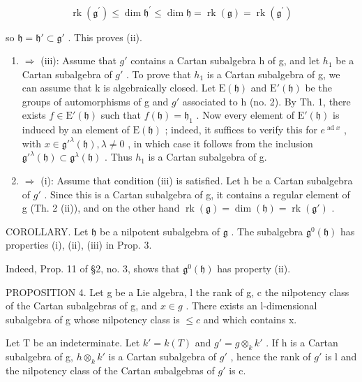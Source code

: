 \[
\operatorname{rk} \left(\mathfrak {g} ^ {\prime}\right) \leq \dim \mathfrak {h} ^ {\prime} \leq \dim \mathfrak {h} = \operatorname{rk} (\mathfrak {g}) = \operatorname{rk} \left(\mathfrak {g} ^ {\prime}\right)
\]

so \(\mathfrak{h} = \mathfrak{h}'\subset \mathfrak{g}'\) . This proves (ii).

\begin{enumerate}
\def\labelenumi{(\roman{enumi})}
\setcounter{enumi}{1}
\item
  \(\Longrightarrow\) (iii): Assume that \(g'\) contains a Cartan subalgebra h of g, and let \(h_{1}\) be a Cartan subalgebra of \(g'\) . To prove that \(h_{1}\) is a Cartan subalgebra of g, we can assume that k is algebraically closed. Let \(\mathrm{E}(\mathfrak{h})\) and \(\mathrm{E}'(\mathfrak{h})\) be the groups of automorphisms of g and \(g'\) associated to h (no. 2). By Th. 1, there exists \(f \in \mathrm{E}'(\mathfrak{h})\) such that \(f(\mathfrak{h}) = \mathfrak{h}_{1}\) . Now every element of \(\mathrm{E}'(\mathfrak{h})\) is induced by an element of \(\mathrm{E}(\mathfrak{h})\) ; indeed, it suffices to verify this for \(e^{\operatorname{ad} x}\) , with \(x \in \mathfrak{g}'^{\lambda}(\mathfrak{h}), \lambda \neq 0\) , in which case it follows from the inclusion \(\mathfrak{g}'^{\lambda}(\mathfrak{h}) \subset \mathfrak{g}^{\lambda}(\mathfrak{h})\) . Thus \(h_{1}\) is a Cartan subalgebra of g.
\item
  \(\Longrightarrow\) (i): Assume that condition (iii) is satisfied. Let h be a Cartan subalgebra of \(g'\) . Since this is a Cartan subalgebra of g, it contains a regular element of g (Th. 2 (ii)), and on the other hand \(\operatorname{rk}(\mathfrak{g}) = \dim(\mathfrak{h}) = \operatorname{rk}(\mathfrak{g}')\) .
\end{enumerate}

COROLLARY. Let \(\mathfrak{h}\) be a nilpotent subalgebra of \(\mathfrak{g}\) . The subalgebra \(\mathfrak{g}^0 (\mathfrak{h})\) has properties (i), (ii), (iii) in Prop. 3.

Indeed, Prop. 11 of §2, no. 3, shows that \(\mathfrak{g}^0 (\mathfrak{h})\) has property (ii).

PROPOSITION 4. Let g be a Lie algebra, l the rank of g, c the nilpotency class of the Cartan subalgebras of g, and \(x \in g\) . There exists an l-dimensional subalgebra of g whose nilpotency class is \(\leq c\) and which contains x.

Let T be an indeterminate. Let \(k' = k(T)\) and \(g' = g \otimes_k k'\) . If h is a Cartan subalgebra of g, \(h \otimes_k k'\) is a Cartan subalgebra of \(g'\) , hence the rank of \(g'\) is l and the nilpotency class of the Cartan subalgebras of \(g'\) is c.


